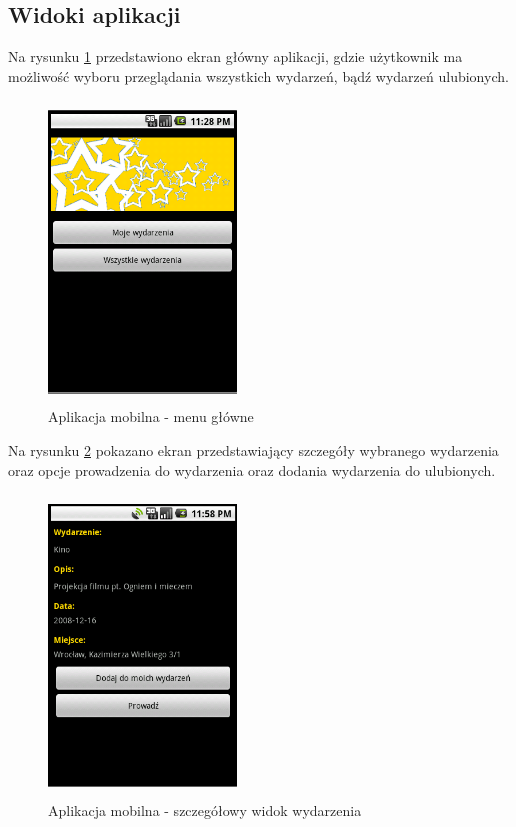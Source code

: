 \documentclass[a4paper]{article}
\begin{document}
\subsection{Widoki aplikacji}

Na rysunku \ref{android-menu} przedstawiono ekran główny aplikacji, gdzie użytkownik ma możliwość wyboru przeglądania wszystkich wydarzeń, bądź wydarzeń ulubionych.

\begin{figure}[!h]
\begin{center}
  \includegraphics[width=5cm, height=8cm]{android-menu.png}
  \caption{Aplikacja mobilna - menu główne
  \label{android-menu}}
\end{center}
\end{figure}

Na rysunku \ref{android-szczegoly} pokazano ekran przedstawiający szczegóły wybranego wydarzenia oraz opcje prowadzenia do wydarzenia oraz dodania wydarzenia do ulubionych.

\begin{figure}[!h]
\begin{center}
  \includegraphics[width=5cm, height=8cm]{android-szczegoly.png}
  \caption{Aplikacja mobilna - szczegółowy widok wydarzenia
  \label{android-szczegoly}}
\end{center}
\end{figure}
\end{document}
